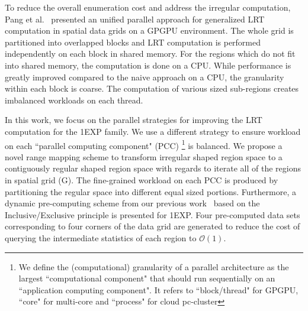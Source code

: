 \documentclass[10pt,journal,cspaper,compsoc]{IEEEtran}
\newcommand\bigo{\mathcal O}
\begin{document}
\noindent To reduce the overall enumeration cost and address the irregular computation, Pang et al.~\cite{apweb} presented an unified parallel approach for generalized LRT computation in spatial data grids on a GPGPU environment. The whole grid is partitioned into overlapped blocks and LRT computation is performed independently on each block in shared memory. For the regions which do not fit into shared memory, the computation is done on a CPU. While performance is greatly improved compared to the naive approach on a CPU, the granularity within each block is coarse. The computation of various sized sub-regions creates imbalanced workloads on each thread.

\noindent In this work, we focus on the parallel strategies for improving the LRT computation for the 1EXP family. We use a different strategy to ensure workload on each ``parallel computing component" (PCC) \footnote{We define the (computational) granularity of a parallel architecture as the largest ``computational component" that should run sequentially on an ``application computing component". It refers to ``block/thread" for GPGPU, ``core" for multi-core and ``process" for cloud pc-cluster} is balanced. We propose a novel range mapping scheme to transform irregular shaped region space to a contiguously regular shaped region space with regards to iterate all of the regions in spatial grid (G). The fine-grained workload on each PCC is produced by partitioning the regular space into different equal sized portions. Furthermore, a dynamic pre-computing scheme from our previous work~\cite{apweb} based on the Inclusive/Exclusive principle is presented for 1EXP. Four pre-computed data sets corresponding to four 
corners of the data grid are generated to reduce the cost of querying the intermediate statistics of each region to $\bigo(1)$.
\end{document}
